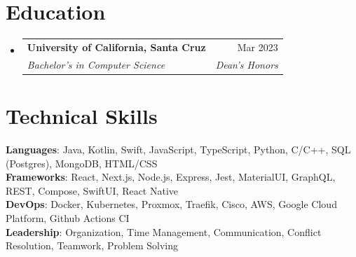 \documentclass[letterpaper,11pt]{article}
\makeatletter
\newcommand{\resumeSubheading}[4]{
  \vspace{-2pt}\item
    \begin{tabular*}{0.97\textwidth}[t]{l@{\extracolsep{\fill}}r}
      \textbf{#1} & #2 \\
      \textit{\small#3} & \textit{\small #4} \\
    \end{tabular*}\vspace{-7pt}
}
\newcommand{\resumeSubHeadingListStart}{\begin{itemize}[leftmargin=0.15in, label={}]}
\newcommand{\resumeSubHeadingListEnd}{\end{itemize}}
\makeatother
\begin{document}
\section{Education}
\resumeSubHeadingListStart
\resumeSubheading
{University of California, Santa Cruz}{Mar 2023}
{Bachelor's in Computer Science}{Dean's Honors}
\resumeSubHeadingListEnd

\section{Technical Skills}
\begin{itemize}[leftmargin=0.15in, label={}]
	\small{\item{
	      \textbf{Languages}{: Java, Kotlin, Swift, JavaScript, TypeScript, Python, C/C++, SQL (Postgres), MongoDB, HTML/CSS} \\
	      \textbf{Frameworks}{: React, Next.js, Node.js, Express, Jest, MaterialUI, GraphQL, REST, Compose, SwiftUI, React Native} \\
	      \textbf{DevOps}{: Docker, Kubernetes, Proxmox, Traefik, Cisco, AWS, Google Cloud Platform, Github Actions CI} \\
	      \textbf{Leadership}{: Organization, Time Management, Communication, Conflict Resolution, Teamwork, Problem Solving}
	      }}
\end{itemize}

\end{document}
